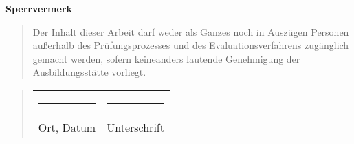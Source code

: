 \begin{titlepage}
	\begin{center}
		\vspace*{1cm}
		\Huge\bf Sperrvermerk\\
		\vspace*{2cm}
		\large\rm
		
		\begin{quotation}
			\hspace*{-1.75em}
			\parbox{0.85\textwidth}{\singlespacing Der Inhalt dieser Arbeit darf weder als Ganzes noch in Auszü\-gen Personen außerhalb des Prüfungsprozesses und des Eva\-luationsverfahrens zugänglich gemacht werden, sofern keine\break anders lautende Genehmigung der Ausbildungsstätte vorliegt.}
		\end{quotation}
		\vspace*{0.5cm}
		\begin{quotation}
			\hspace*{-1.5em}
			\parbox{\textwidth}{
				\singlespacing
				\begin{tabularx}{0.83\textwidth}{l@{\extracolsep\fill}l}
					\rule{4cm}{0.3mm}&\rule{4cm}{0.3mm}\\
					\large
					Ort, Datum&\large Unterschrift
				\end{tabularx}}
			\end{quotation}
		\end{center}
	\end{titlepage}
	\newpage
	\setcounter{page}{3}

